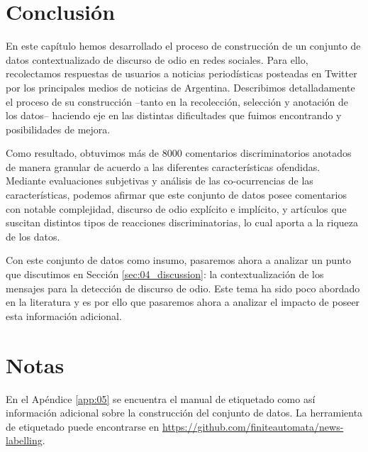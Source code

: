 \section{Conclusión}


En este capítulo hemos desarrollado el proceso de construcción de un conjunto de datos contextualizado de discurso de odio en redes sociales. Para ello, recolectamos respuestas de usuarios a noticias periodísticas posteadas en Twitter por los principales medios de noticias de Argentina. Describimos detalladamente el proceso de su construcción --tanto en la recolección, selección y anotación de los datos-- haciendo eje en las distintas dificultades que fuimos encontrando y posibilidades de mejora.

Como resultado, obtuvimos más de \num{8000} comentarios discriminatorios anotados de manera granular de acuerdo a las diferentes características ofendidas. Mediante evaluaciones subjetivas y análisis de las co-ocurrencias de las características, podemos afirmar que este conjunto de datos posee comentarios con notable complejidad, discurso de odio explícito e implícito, y artículos que suscitan distintos tipos de reacciones discriminatorias, lo cual aporta a la riqueza de los datos.

Con este conjunto de datos como insumo, pasaremos ahora a analizar un punto que discutimos en Sección \ref{sec:04_discussion}: la contextualización de los mensajes para la detección de discurso de odio. Este tema ha sido poco abordado en la literatura y es por ello que pasaremos ahora a analizar el impacto de poseer esta información adicional.

\section{Notas}


En el Apéndice \ref{app:05} se encuentra el manual de etiquetado como así información adicional sobre la construcción del conjunto de datos. La herramienta de etiquetado puede encontrarse en \url{https://github.com/finiteautomata/news-labelling}.
